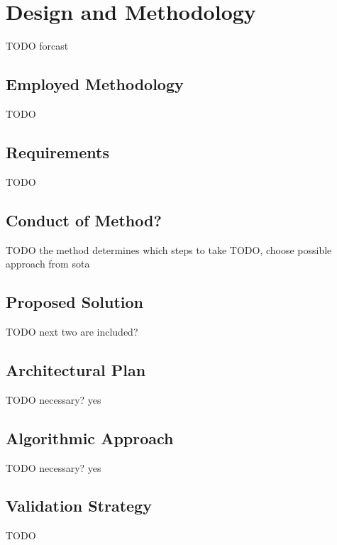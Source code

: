 \chapter{Design and Methodology}
\label{chap:design}
TODO forcast

\section{Employed Methodology}
TODO

\section{Requirements}
TODO

\section{Conduct of Method?}
TODO the method determines which steps to take
TODO, choose possible approach from sota

\section{Proposed Solution}
TODO next two are included?

\section{Architectural Plan}
TODO necessary? yes

\section{Algorithmic Approach}
TODO necessary? yes

\section{Validation Strategy}

TODO